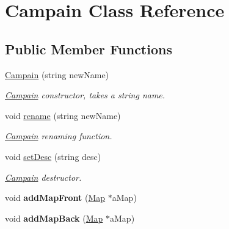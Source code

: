 \hypertarget{class_campain}{}\section{Campain Class Reference}
\label{class_campain}
\subsection*{Public Member Functions}
\begin{DoxyCompactItemize}
\item 
\hypertarget{class_campain_a40b98ccc22d64dd714be0944970597a8}{}\label{class_campain_a40b98ccc22d64dd714be0944970597a8} 
\hyperlink{class_campain_a40b98ccc22d64dd714be0944970597a8}{Campain} (string new\+Name)
\begin{DoxyCompactList}\small\item\em \hyperlink{class_campain}{Campain} constructor, takes a string name. \end{DoxyCompactList}\item 
\hypertarget{class_campain_ad14dd3cbece20b9737b282fccf4f0ee0}{}\label{class_campain_ad14dd3cbece20b9737b282fccf4f0ee0} 
void \hyperlink{class_campain_ad14dd3cbece20b9737b282fccf4f0ee0}{rename} (string new\+Name)
\begin{DoxyCompactList}\small\item\em \hyperlink{class_campain}{Campain} renaming function. \end{DoxyCompactList}\item 
\hypertarget{class_campain_aa2e22983799e1b99ea554796398c97f1}{}\label{class_campain_aa2e22983799e1b99ea554796398c97f1} 
void \hyperlink{class_campain_aa2e22983799e1b99ea554796398c97f1}{set\+Desc} (string desc)
\begin{DoxyCompactList}\small\item\em \hyperlink{class_campain}{Campain} destructor. \end{DoxyCompactList}\item 
\hypertarget{class_campain_a9d021544799e1555b1f089f3eed95338}{}\label{class_campain_a9d021544799e1555b1f089f3eed95338} 
void {\bfseries add\+Map\+Front} (\hyperlink{class_map}{Map} $\ast$a\+Map)
\item 
\hypertarget{class_campain_aa4a1e6002804d4f75fe985dde1029ae1}{}\label{class_campain_aa4a1e6002804d4f75fe985dde1029ae1} 
void {\bfseries add\+Map\+Back} (\hyperlink{class_map}{Map} $\ast$a\+Map)
\item 
\hypertarget{class_campain_a04709871fad87493c7dc368d18282f61}{}\label{class_campain_a04709871fad87493c7dc368d18282f61} 

\end{DoxyCompactItemize}

